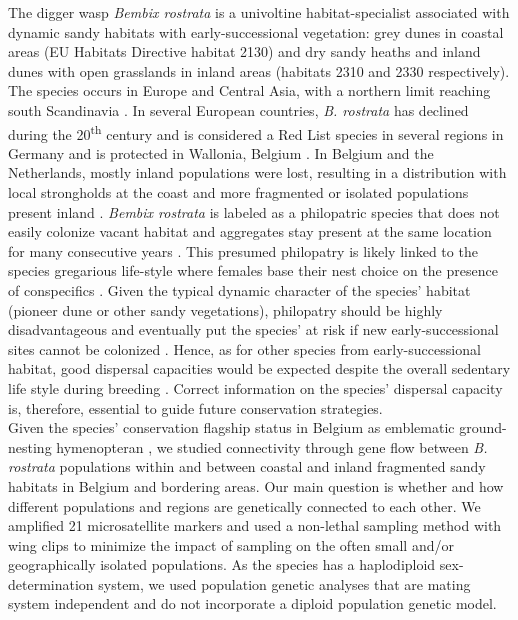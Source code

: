 \documentclass[10pt, twoside]{book} %
\begin{document}
	The digger wasp \textit{Bembix rostrata} is a univoltine habitat-specialist associated with dynamic sandy habitats with early-successional vegetation: grey dunes in coastal areas (EU Habitats Directive habitat 2130) and dry sandy heaths and inland dunes with open grasslands in inland areas (habitats 2310 and 2330 respectively). The species occurs in Europe and Central Asia, with a northern limit reaching south Scandinavia \citep{bitsch1997}. In several European countries, \textit{B. rostrata} has declined during the 20\textsuperscript{th} century and is considered a Red List species in several regions in Germany and is protected in Wallonia, Belgium \citep{blosch2000, jacobs2000, klein2004, barbier2007, bogusch2021}. In Belgium and the Netherlands, mostly inland populations were lost, resulting in a distribution with local strongholds at the coast and more fragmented or isolated populations present inland \citep{klein2004}. \textit{Bembix rostrata} is labeled as a philopatric species that does not easily colonize vacant habitat and aggregates stay present at the same location for many consecutive years \citep{nielsen1945, larsson1986, bogusch2021}. This presumed philopatry is likely linked to the species gregarious life-style where females base their nest choice on the presence of conspecifics \citep[chapter \ref{chapter2}]{batsleer2022}. Given the typical dynamic character of the species' habitat (pioneer dune or other sandy vegetations), philopatry should be highly disadvantageous and eventually put the species' at risk if new early-successional sites cannot be colonized \citep{bogusch2021}. Hence, as for other species from early-successional habitat, good dispersal capacities would be expected despite the overall sedentary life style during breeding \citep[e.g. \textit{Andrena vaga}:][]{cerna2013, exeler2008}. Correct information on the species' dispersal capacity is, therefore, essential to guide future conservation strategies.\\
	
	Given the species' conservation flagship status in Belgium as emblematic ground-nesting hymenopteran \citep{batsleer2021b}, we studied connectivity through gene flow between \textit{B. rostrata} populations within and between coastal and inland fragmented sandy habitats in Belgium and bordering areas. Our main question is whether and how different populations and regions are genetically connected to each other. We amplified 21 microsatellite markers and used a non-lethal sampling method with wing clips \citep{chaline2004} to minimize the impact of sampling on the often small and/or geographically isolated populations. As the species has a haplodiploid sex-determination system, we used population genetic analyses that are mating system independent and do not incorporate a diploid population genetic model.\\
	\clearpage
	
\end{document}

